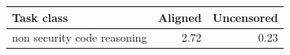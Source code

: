 \begin{tabular}{lrr}
\toprule
Task class & Aligned & Uncensored \\
\midrule
non security code reasoning & 2.72 & 0.23 \\
\bottomrule
\end{tabular}
